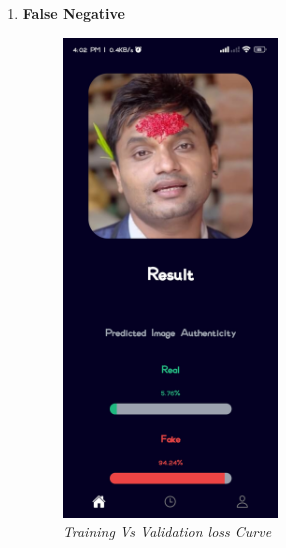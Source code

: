 \begin{enumerate}
          \newpage


    \item \textbf{False Negative}
       
          \begin{figure}[ht]
              \centering
              \includegraphics[height =5in ]{img/dashainResult.jpg}
              \caption{\textit{Training Vs Validation loss Curve}}
          \end{figure}


          \newpage

\end{enumerate}

